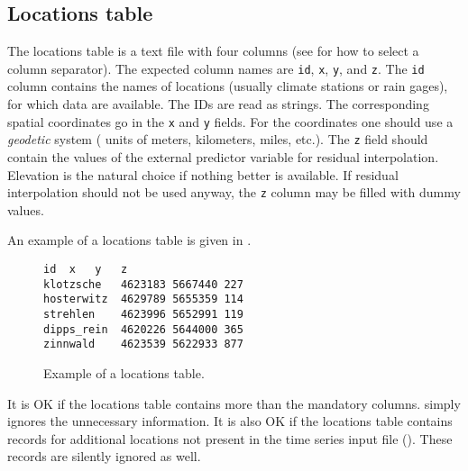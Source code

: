 \subsection{Locations table} \label{sec:meteofill:input:locationsTable}
The locations table is a text file with four columns (see  for how to select a column separator). The expected column names are \texttt{id}, \texttt{x}, \texttt{y}, and \texttt{z}. The \texttt{id} column contains the names of locations (usually climate stations or rain gages), for which data are available. The IDs are read as strings. The corresponding spatial coordinates go in the \texttt{x} and \texttt{y} fields. For the coordinates one should use a \emph{geodetic} system (\ie{} units of meters, kilometers, miles, etc.). The \texttt{z} field should contain the values of the external predictor variable for residual interpolation. Elevation is the natural choice if nothing better is available. If residual interpolation should not be used anyway, the \texttt{z} column may be filled with dummy values.

An example of a locations table is given in .

\begin{figure}
\begin{lstlisting}[style=txt]
id	x	y	z
klotzsche	4623183	5667440	227
hosterwitz	4629789	5655359	114
strehlen	4623996	5652991	119
dipps_rein	4620226	5644000	365
zinnwald	4623539	5622933	877
\end{lstlisting}
  \caption{Example of a locations table. \label{fig:meteofill:input:locationsTable}}
\end{figure}

It is OK if the locations table contains more than the mandatory columns.  simply ignores the unnecessary information. It is also OK if the locations table contains records for additional locations not present in the time series input file (). These records are silently ignored as well.

